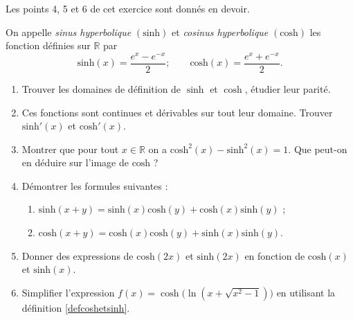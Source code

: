 
\begin{exercice}\label{exostarterST-0015}

  \begin{remark}
    Les points 4, 5 et 6 de cet exercice sont donnés en devoir.
  \end{remark}

On appelle \emph{sinus hyperbolique} $(\text{sinh})$ et \emph{cosinus hyperbolique} $(\text{cosh})$ les fonction définies sur $\mathbb{R}$ par 
\begin{equation}\label{defcoshetsinh}
  \text{sinh}(x) = \frac{e^x-e^{-x}}{2} ; \qquad  \text{cosh}(x) = \frac{e^x+e^{-x}}{2}. 
\end{equation}
\begin{enumerate}
\item Trouver les domaines de définition de  $\sinh$ et $\cosh$, étudier leur parité. 
\item Ces fonctions sont continues et dérivables sur tout leur domaine. Trouver $\text{sinh}'(x)$ et  $\text{cosh}'(x)$.
\item Montrer que pour tout $x\in\mathbb{R}$ on a  $\text{cosh}^2 (x) - \text{sinh}^2 (x) = 1$. Que peut-on en déduire sur l'image de $\text{cosh}$ ?
\item Démontrer les formules suivantes :
\begin{enumerate}
\item $\text{sinh} (x+y)=\text{sinh}(x) \text{cosh}(y)+\text{cosh}(x)\text{sinh}(y)$ ;
\item $\text{cosh} (x+y)=\text{cosh}(x) \text{cosh}(y)+\text{sinh}(x)\text{sinh}(y)$.
\end{enumerate}
\item Donner des expressions de $\text{cosh}(2x)$ et $\text{sinh}(2x)$  en fonction de $\text{cosh}(x)$ et $\text{sinh}(x)$.
\item Simplifier l'expression $f(x)=\cosh\Big(\ln(x+\sqrt{x^2-1})\Big)$ en utilisant la définition \eqref{defcoshetsinh}.
\end{enumerate}


\end{exercice}

